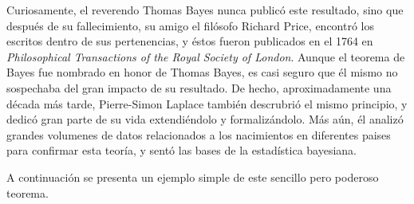 \documentclass[
  10pt,
  spanish,
]{book}
\theoremstyle{definition}
\theoremstyle{definition}
\theoremstyle{definition}
\theoremstyle{definition}
\theoremstyle{remark}
\begin{document}
Curiosamente, el reverendo Thomas Bayes nunca publicó este resultado,
sino que después de su fallecimiento, su amigo el filósofo Richard
Price, encontró los escritos dentro de sus pertenencias, y éstos fueron
publicados en el 1764 en
\emph{Philosophical Transactions of the Royal Society of London}. Aunque
el teorema de Bayes fue nombrado en honor de Thomas Bayes, es casi
seguro que él mismo no sospechaba del gran impacto de su resultado. De hecho, aproximadamente una década más tarde, Pierre-Simon Laplace también descrubrió el mismo principio, y dedicó gran parte de su vida extendiéndolo y formalizándolo. Más aún, él analizó grandes volumenes de datos relacionados a los nacimientos en diferentes paises para confirmar esta teoría, y sentó las bases de la estadística bayesiana.

A continuación se presenta un ejemplo simple de este sencillo pero
poderoso teorema.
\end{document}
